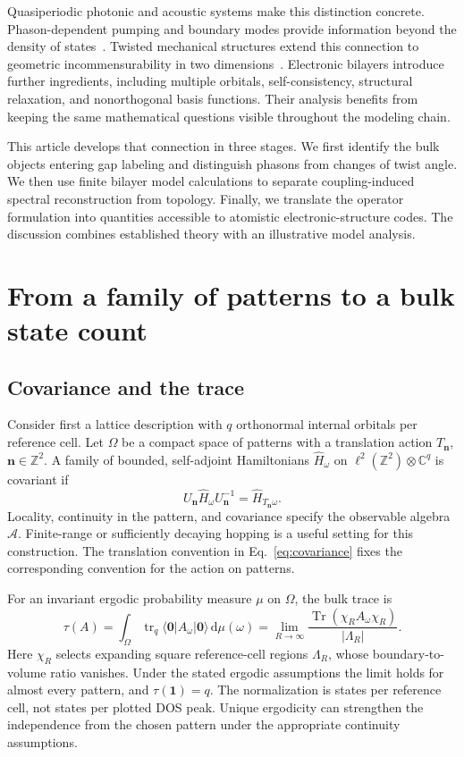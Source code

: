 \documentclass[11pt,a4paper]{article}
\newcommand{\Tr}{\operatorname{Tr}}
\newcommand{\tr}{\operatorname{tr}}
\newcommand{\dd}{\mathrm{d}}
\newcommand{\Id}{\mathbf{1}}
\begin{document}
Quasiperiodic photonic and acoustic systems make this distinction concrete. Phason-dependent pumping and boundary modes provide information beyond the density of states~\cite{kraus2012,ni2019}. Twisted mechanical structures extend this connection to geometric incommensurability in two dimensions~\cite{rosa2021}. Electronic bilayers introduce further ingredients, including multiple orbitals, self-consistency, structural relaxation, and nonorthogonal basis functions. Their analysis benefits from keeping the same mathematical questions visible throughout the modeling chain.

This article develops that connection in three stages. We first identify the bulk objects entering gap labeling and distinguish phasons from changes of twist angle. We then use finite bilayer model calculations to separate coupling-induced spectral reconstruction from topology. Finally, we translate the operator formulation into quantities accessible to atomistic electronic-structure codes. The discussion combines established theory with an illustrative model analysis.

\section{From a family of patterns to a bulk state count}
\label{sec:bulk}

\subsection{Covariance and the trace}

Consider first a lattice description with $q$ orthonormal internal orbitals per reference cell. Let $\Omega$ be a compact space of patterns with a translation action $T_{\bm n}$, $\bm n\in\mathbb Z^2$. A family of bounded, self-adjoint Hamiltonians $\hat H_\omega$ on $\ell^2(\mathbb Z^2)\otimes\mathbb C^q$ is covariant if
\begin{equation}
 U_{\bm n}\hat H_\omega U_{\bm n}^{-1}=\hat H_{T_{\bm n}\omega}.
 \label{eq:covariance}
\end{equation}
Locality, continuity in the pattern, and covariance specify the observable algebra $\mathcal A$. Finite-range or sufficiently decaying hopping is a useful setting for this construction. The translation convention in Eq.~\eqref{eq:covariance} fixes the corresponding convention for the action on patterns.

For an invariant ergodic probability measure $\mu$ on $\Omega$, the bulk trace is
\begin{equation}
 \tau(A)=\int_\Omega \tr_q\langle\bm 0|A_\omega|\bm 0\rangle\,\dd\mu(\omega)
 =\lim_{R\to\infty}\frac{\Tr(\chi_R A_\omega\chi_R)}{|\Lambda_R|}.
 \label{eq:trace}
\end{equation}
Here $\chi_R$ selects expanding square reference-cell regions $\Lambda_R$, whose boundary-to-volume ratio vanishes. Under the stated ergodic assumptions the limit holds for almost every pattern, and $\tau(\Id)=q$. The normalization is states per reference cell, not states per plotted DOS peak. Unique ergodicity can strengthen the independence from the chosen pattern under the appropriate continuity assumptions.
\end{document}
